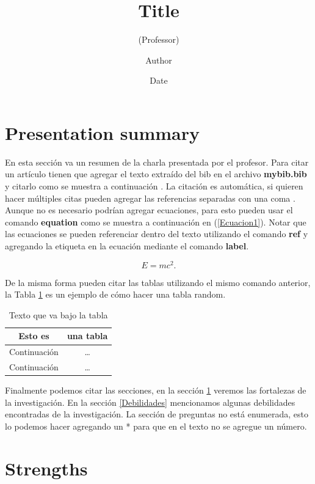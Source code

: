 \documentclass{article}
\title{Title}
\subtitle{(Professor)}
\author{Author}
\date{Date}
\begin{document}
\maketitle

\section*{Presentation summary}
En esta sección va un resumen de la charla presentada por el profesor. Para citar un artículo tienen que agregar el texto extraído del bib en el archivo \textbf{mybib.bib} y citarlo como se muestra a continuación \cite{Tahamtan2016}. La citación es automática, si quieren hacer múltiples citas pueden agregar las referencias separadas con una coma \cite{Tahamtan2016, Kurtz2005}. Aunque no es necesario podrían agregar ecuaciones, para esto pueden usar el comando \textbf{equation} como se muestra a continuación en (\ref{Ecuacion1}). Notar que las ecuaciones se pueden referenciar dentro del texto utilizando el comando \textbf{ref} y agregando la etiqueta en la ecuación mediante el comando \textbf{label}.

\begin{equation}\label{Ecuacion1}
    E = mc^2.
\end{equation}

De la misma forma pueden citar las tablas utilizando el mismo comando anterior, la Tabla \ref{Mitabla} es un ejemplo de cómo hacer una tabla random.

\begin{table}[h]
    \centering
    \begin{tabular}{cc}
    \hline
        Esto es & una tabla \\
    \hline
        Continuación & \dots \\
        Continuación & \dots \\
        \hline
    \end{tabular}
    \caption{Texto que va bajo la tabla}
    \label{Mitabla}
\end{table}

Finalmente podemos citar las secciones, en la sección \ref{Fortalezas} veremos las fortalezas de la investigación. En la sección \ref{Debilidades} mencionamos algunas debilidades encontradas de la investigación. La sección de preguntas no está enumerada, esto lo podemos hacer agregando un {*} para que en el texto no se agregue un número.

\section{Strengths}\label{Fortalezas}
\end{document}
